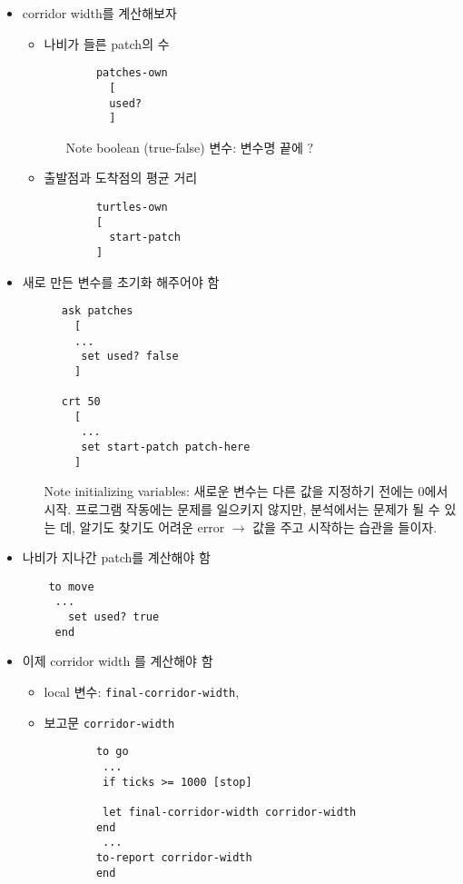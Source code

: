 \documentclass[hyperref={unicode}]{beamer}
\begin{document}
\begin{frame}[fragile]
\begin{itemize}
\item corridor width를 계산해보자
	\begin{itemize}
	\item 나비가 들른 patch의 수
		\begin{verbatim}
		patches-own
		  [
		  used?
		  ]
		\end{verbatim}
		\begin{itemize}
		\item[Note] boolean (true-false) 변수: 변수명 끝에 $?$
		\end{itemize}
	\item 출발점과 도착점의 평균 거리
		\begin{verbatim}
		turtles-own
		[
		  start-patch
		]
		\end{verbatim}
	\end{itemize}
\end{itemize}	
\end{frame}

\begin{frame}[fragile]
\begin{itemize}
\item 새로 만든 변수를 초기화 해주어야 함
	\begin{verbatim}
	  ask patches
	    [
	    ...
	     set used? false
	    ]

	  crt 50
	    [
	     ...
	     set start-patch patch-here
	    ]
	\end{verbatim}
		\begin{itemize}
		\item[Note] initializing variables: 새로운 변수는 다른 값을 지정하기 전에는 $0$에서 시작. 프로그램 작동에는 문제를 일으키지 않지만, 분석에서는 문제가 될 수 있는 데, 알기도 찾기도 어려운 error $\rightarrow$ 값을 주고 시작하는 습관을 들이자.
		\end{itemize}
\end{itemize}	
\end{frame}

\begin{frame}[fragile]
\begin{itemize}
\item 나비가 지나간 patch를 계산해야 함
	\begin{verbatim}
	to move
	 ...
	   set used? true
     end
	\end{verbatim}
\item 이제 corridor width 를 계산해야 함
	\begin{itemize}
	\item local 변수: \verb|final-corridor-width|, 
	\item 보고문 \verb|corridor-width|
		\begin{verbatim}
		to go
		 ...
		 if ticks >= 1000 [stop]
				  
		 let final-corridor-width corridor-width
		end
		 ...
		to-report corridor-width
		end
		\end{verbatim}
	\end{itemize}	
\end{itemize}	
\end{frame}
\end{document}
